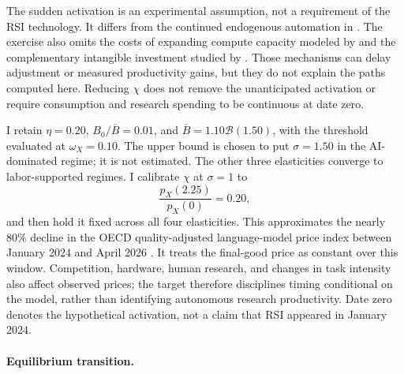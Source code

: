 The sudden activation is an experimental assumption, not a requirement of
the RSI technology. It differs from the continued endogenous automation in
\citet{jonestonetti2026}. The exercise also omits the costs of expanding
compute capacity modeled by \citet{erdiletal2025gate} and the complementary
intangible investment studied by \citet{brynjolfssonrocksyverson2021}.
Those mechanisms can delay adjustment or measured productivity gains, but
they do not explain the paths computed here. Reducing $\chi$ does not remove
the unanticipated activation or require consumption and research spending
to be continuous at date zero.



I retain $\eta=0.20$, $B_0/\overline B=0.01$, and
$\overline B=1.10\mathcal B(1.50)$, with the threshold evaluated at
$\omega_X=0.10$. The upper bound is chosen to put $\sigma=1.50$ in the
AI-dominated regime; it is not estimated. The other three elasticities
converge to labor-supported regimes. I calibrate $\chi$ at $\sigma=1$ to
\begin{equation}
 \frac{p_X(2.25)}{p_X(0)}=0.20,
 \label{eq:rewrite-rsi-price-target}
\end{equation}
and then hold it fixed across all four elasticities. This approximates the
nearly $80\%$ decline in the OECD quality-adjusted language-model price index
between January 2024 and April 2026 \citep{oecdaimarkets2026}. It treats the
final-good price as constant over this window. Competition, hardware,
human research, and changes in task intensity also affect observed prices;
the target therefore disciplines timing conditional on the model, rather
than identifying autonomous research productivity. Date zero denotes the
hypothetical activation, not a claim that RSI appeared in January 2024.

\paragraph{Equilibrium transition.}
\label{subsec:rewrite-rsi-results}


